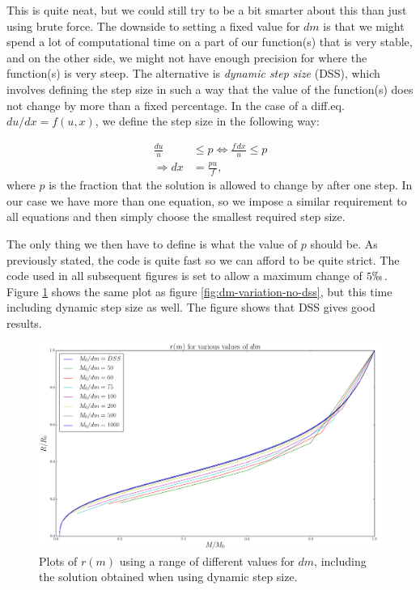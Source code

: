 \documentclass[11pt,twocolumn]{article}
\begin{document}
This is quite neat, but we could still try to be a bit smarter about
this than just using brute force. The downside to setting a fixed value for $dm$ is that we might spend
a lot of computational time on a part of our function(s) that is very
stable, and on the other side, we might not have enough precision for
where the function(s) is very steep. The alternative is \emph{dynamic
  step size} (DSS), which involves defining the step size in such a way
that the value of the function(s) does not change by more than a fixed
percentage. In the case of a diff.eq. $du/dx = f(u,x)$, we define the
step size in the following way:

\begin{align}
  \frac{du}{u} &\leq p\Leftrightarrow \frac{f\,dx}{u} \leq p\\
  \Rightarrow dx &= \frac{pu}{f},
\end{align}
where $p$ is the fraction that the solution is allowed to change by
after one step. In our case we have more than one equation, so we
impose a similar requirement to all equations and then simply choose
the smallest required step size.

The only thing we then have to define is what the value of $p$ should
be. As previously stated, the code is quite fast so we can afford to
be quite strict. The code used in all subsequent figures is set to
allow a maximum change of $5 \permil$. Figure \ref{fig:dm_variation}
shows the same plot as figure \ref{fig:dm-variation-no-dss}, but this
time including dynamic step size as well. The figure shows that DSS
gives good results. 

\begin{figure}[ht]
  \centering
  \includegraphics[width=\linewidth]{fig/dm_variation.png}
  \caption{\label{fig:dm_variation} Plots of $r(m)$ using a range of
    different values for $dm$, including the solution obtained when
    using dynamic step size.}
\end{figure}
\end{document}
